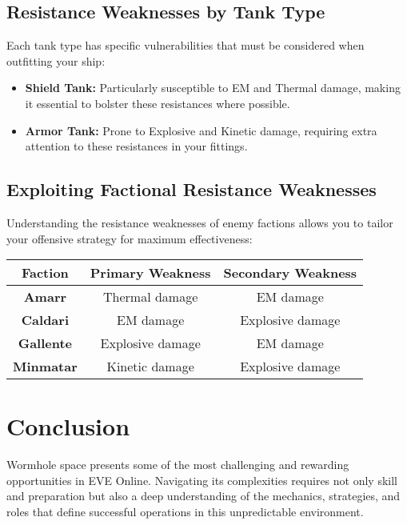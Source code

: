 \documentclass[a4paper,12pt]{article}
\begin{document}
\subsection{Resistance Weaknesses by Tank Type}

Each tank type has specific vulnerabilities that must be considered when outfitting your ship:

\begin{itemize}
    \item \textbf{Shield Tank:} Particularly susceptible to EM and Thermal damage, making it essential to bolster these resistances where possible.
    \item \textbf{Armor Tank:} Prone to Explosive and Kinetic damage, requiring extra attention to these resistances in your fittings.
\end{itemize}

\subsection{Exploiting Factional Resistance Weaknesses}

Understanding the resistance weaknesses of enemy factions allows you to tailor your offensive strategy for maximum effectiveness:

\begin{table}[h!]
\centering
\begin{tabular}{|c|c|c|}
\hline
\textbf{Faction} & \textbf{Primary Weakness} & \textbf{Secondary Weakness} \\ \hline
\textbf{Amarr} & Thermal damage & EM damage \\ \hline
\textbf{Caldari} & EM damage & Explosive damage \\ \hline
\textbf{Gallente} & Explosive damage & EM damage \\ \hline
\textbf{Minmatar} & Kinetic damage & Explosive damage \\ \hline
\end{tabular}
\end{table}

\section{Conclusion}

Wormhole space presents some of the most challenging and rewarding opportunities in EVE Online. Navigating its complexities requires not only skill and preparation but also a deep understanding of the mechanics, strategies, and roles that define successful operations in this unpredictable environment. 
\end{document}
